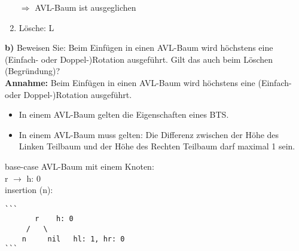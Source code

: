 \begin{multicols}{2}
\begin{enumerate}

$\Rightarrow$ AVL-Baum ist ausgeglichen

\item Lösche: L


\end{enumerate}
\end{multicols}

\newpage
\noindent
\textbf{b)} Beweisen Sie: Beim Einfügen in einen AVL-Baum wird höchstens eine (Einfach- oder Doppel-)Rotation ausgeführt. Gilt das auch beim Löschen (Begründung)?\\


\noindent
\textbf{Annahme:} Beim Einfügen in einen AVL-Baum wird höchstens eine (Einfach- oder Doppel-)Rotation ausgeführt.
\begin{itemize}
	\item In einem AVL-Baum gelten die Eigenschaften eines BTS.
	\item In einem AVL-Baum muss gelten: Die Differenz zwischen der Höhe des Linken Teilbaum und der Höhe des Rechten Teilbaum darf maximal 1 sein.
\end{itemize}

\noindent
base-case AVL-Baum mit einem Knoten: \\
r $\rightarrow$ h: 0 \\

\noindent
insertion (n):
\begin{verbatim}
```
       r 	h: 0
     /   \
    n     nil 	hl: 1, hr: 0
```
\end{verbatim}

